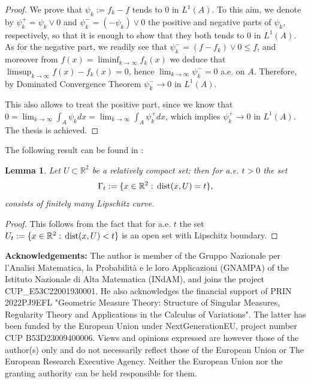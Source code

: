 \documentclass[a4paper,11pt]{article}
\numberwithin{equation}{section}
\newtheorem{lemma}[theorem]{Lemma}
\def\dist{\,{\rm dist}}
\newcommand{\R}{\mathbb{R}}
\begin{document}
\begin{proof}
We prove that $\psi_k:=f_k-f$ tends to $0$ in $L^1(A)$. To this aim, we denote by $\psi_k^+=\psi_k\vee 0$ and $\psi_k^-=(-\psi_k)\vee 0$ the positive and negative parts of $\psi_k$, respectively, so that it is enough to show that they both tends to $0$ in $L^1(A)$. As for the negative part, we readily see that  $\psi_k^-=(f-f_k)\vee0\leq f$, and moreover from $f(x)=\liminf_{k\rightarrow \infty}f_k(x)$ we deduce that $\limsup_{k\rightarrow \infty}f(x)-f_k(x)=0$, hence $\lim_{k\rightarrow \infty}\psi_k^-=0$ a.e. on $A$. Therefore, by Dominated Convergence Theorem $\psi_k^-\rightarrow 0$ in $L^1(A)$. 

This also allows to treat the  positive part, since we know that $0=\lim_{k\rightarrow \infty}\int_{A}\psi_kdx=\lim_{k\rightarrow \infty}\int_{A}\psi^+_kdx$, which implies $\psi_k^+\rightarrow 0$ in $L^1(A)$. The thesis is achieved. 
\end{proof}

The following result can be found in \cite{Fu}:



\begin{lemma}\label{lem_Fu}
	Let $U\subset\R^2$ be a relatively compact set; then for a.e. $t>0$ the set 
	$$\Gamma_t:=\{x\in \R^2:\dist(x,U)=t\},$$
	consists of finitely many Lipschitz curve.
\end{lemma}

\begin{proof}
This follows from the fact that for a.e. $t$ the set $U_t:=\{x\in \R^2:\dist(x,U)<t\}$ is an open set with Lipschitz boundary.
\end{proof}



\textbf{Acknowledgements:}
The author is  member of the Gruppo Nazionale per l'Analisi Matematica, la Probabilit\`a e le loro Applicazioni (GNAMPA) of the Istituto Nazionale di Alta Matematica (INdAM), and joins the project CUP\_E53C22001930001. He also acknowledges  the financial support of 
PRIN 2022PJ9EFL "Geometric Measure Theory: Structure of Singular Measures, Regularity Theory and Applications in the Calculus of Variations". The latter has been funded by the European Union under NextGenerationEU, project number CUP B53D23009400006. Views and opinions expressed are however those of the author(s) only and do not necessarily reflect those of the European Union or The European Research Executive Agency.  Neither the European Union nor the granting authority can be held responsible for them.
\end{document}
